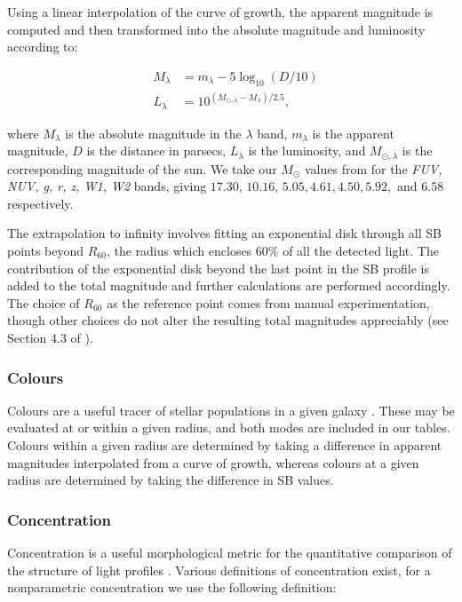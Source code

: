 \documentclass[twocolumn]{aastex631}
\begin{document}
Using a linear interpolation of the curve of growth, the apparent magnitude is computed and then transformed into the absolute magnitude and luminosity according to:

\begin{eqnarray}
        & M_{\lambda} &= m_{\lambda} - 5\log_{10}(D/10)  \\
        & L_{\lambda} &= 10^{(M_{\odot,\lambda} - M_{\lambda})/2.5}, 
\end{eqnarray}

where $M_{\lambda}$ is the absolute magnitude in the $\lambda$ band, $m_{\lambda}$ is the apparent magnitude, $D$ is the distance in parsecs, $L_{\lambda}$ is the luminosity, and $M_{\odot,\lambda}$ is the corresponding magnitude of the sun.
We take our $M_{\odot}$ values from \citet{Willmer2018} for the {\it FUV, NUV, g, r, z, W1, W2} bands, giving $17.30$, $10.16$, $5.05, 4.61, 4.50, 5.92,$ and $6.58$ respectively.

The extrapolation to infinity involves fitting an exponential disk through all SB points beyond $R_{60}$, the radius which encloses $60\%$ of all the detected light.
The contribution of the exponential disk beyond the last point in the SB profile is added to the total magnitude and further calculations are performed accordingly.
The choice of $R_{60}$ as the reference point comes from manual experimentation, though other choices do not alter the resulting total magnitudes appreciably (see Section 4.3 of \citealt{Courteau1996}). 

\subsubsection{Colours}\label{sec:evalcolours}

Colours are a useful tracer of stellar populations in a given galaxy \citep{Conroy2013,Courteau2014}.
These may be evaluated at or within a given radius, and both modes are included in our tables.
Colours within a given radius are determined by taking a difference in apparent magnitudes interpolated from a curve of growth, whereas colours at a given radius are determined by taking the difference in SB values.

\subsubsection{Concentration}\label{sec:evalconcentration}

Concentration is a useful morphological metric for the quantitative comparison of the structure of light profiles \citep{Conselice2014}.
Various definitions of concentration exist, for a nonparametric concentration we use the following definition:  
\end{document}
